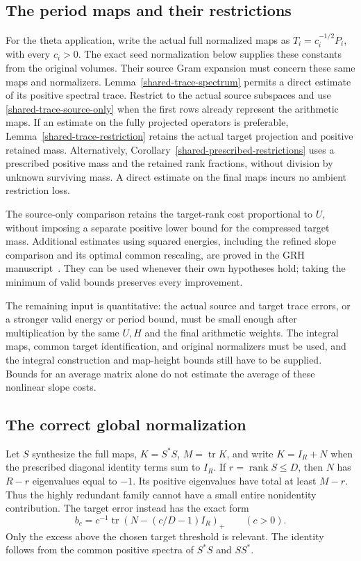 \subsection{The period maps and their restrictions}

For the theta application, write the actual full normalized maps as
\(T_i=c_i^{-1/2}P_i\), with every \(c_i>0\). The exact seed
normalization below supplies these constants from the original volumes.
Their source Gram expansion must concern these same maps and normalizers.
Lemma~\ref{shared-trace-spectrum} permits a direct estimate of its
positive spectral trace. Restrict to the actual source subspaces and
use \eqref{shared-trace-source-only} when the first rows already
represent the arithmetic maps. If an estimate on the fully projected
operators is preferable, Lemma~\ref{shared-trace-restriction}
retains the actual target projection and positive retained mass.
Alternatively, Corollary~\ref{shared-prescribed-restrictions} uses a
prescribed positive mass and the retained rank fractions, without division
by unknown surviving mass. A direct estimate on the final maps incurs
no ambient restriction loss.

The source-only comparison retains the target-rank cost proportional
to \(U\), without imposing a separate positive lower bound for the
compressed target mass. Additional estimates using squared energies,
including the refined slope comparison and its optimal common
rescaling, are proved in the GRH manuscript~\cite{rh-companion}.
They can be used whenever their own hypotheses hold; taking the
minimum of valid bounds preserves every improvement.

The remaining input is quantitative: the actual source and target
trace errors, or a stronger valid energy or period bound, must be
small enough after multiplication by the same \(U,H\) and the final
arithmetic weights. The integral maps, common target identification,
and original normalizers must be used, and the integral construction
and map-height bounds still have to be supplied.
Bounds for an average matrix alone do not estimate the average
of these nonlinear slope costs.

\subsection{The correct global normalization}

Let $S$ synthesize the full maps, $K=S^*S$, $M=\operatorname{tr}K$,
and write $K=I_R+N$
when the prescribed diagonal identity terms sum to $I_R$.
If $r=\operatorname{rank}S\le D$, then $N$ has $R-r$ eigenvalues
equal to $-1$. Its positive eigenvalues have total at least $M-r$.
Thus the highly redundant family cannot have a small entire
nonidentity contribution. The target error instead has the exact form
\[
 b_c=c^{-1}\operatorname{tr}
             \left(N-(c/D-1)I_R\right)_+\qquad(c>0).
\]
Only the excess above the chosen target threshold is relevant.
The identity follows from the common positive spectra of $S^*S$ and $SS^*$.

